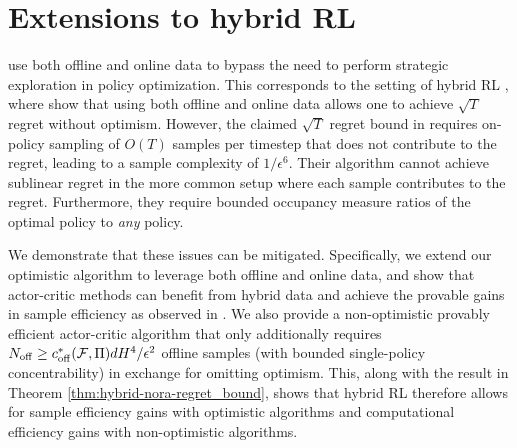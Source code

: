 
\section{Extensions to hybrid RL}

\citet{zhou2023offline} use both offline and online data to bypass the need to perform strategic exploration in policy optimization. This corresponds to the setting of hybrid RL \citep{nakamoto2023calql, amortila2024harnessing, ren2024hybrid, wagenmaker2023leveraging}, where \citet{song2023hybrid} show that using both offline and online data allows one to achieve $\sqrt{T}$ regret without optimism. However, the claimed $\sqrt{T}$ regret bound in \citet{zhou2023offline} requires on-policy sampling of $O(T)$ samples per timestep that does not contribute to the regret, leading to a sample complexity of $1/\epsilon^6$. Their algorithm cannot achieve sublinear regret in the more common setup where each sample contributes to the regret. Furthermore, they require bounded occupancy measure ratios of the optimal policy to \textit{any} policy.

We demonstrate that these issues can be mitigated. Specifically, we extend our optimistic algorithm to leverage both offline and online data, and show that actor-critic methods can benefit from hybrid data and achieve the provable gains in sample efficiency as observed in \cite{li2023reward, tan2024natural, tan2024hybrid}. We also provide a non-optimistic provably efficient actor-critic
algorithm that only additionally requires $N_{{\operatorname{off}}} \geq c_{{\operatorname{off}}}^*({\mathcal{F}},\Pi)dH^4/\epsilon^2$ offline samples (with bounded single-policy concentrability) in exchange for omitting optimism. This, along with the result in Theorem \ref{thm:hybrid-nora-regret_bound}, shows that hybrid RL therefore allows for sample efficiency gains with optimistic algorithms and computational efficiency gains with non-optimistic algorithms. 



